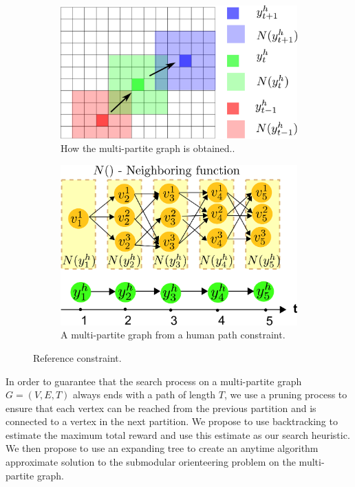 \documentclass[phd]{byuprop}
\begin{document}
\begin{figure}[htbp]
	\centering
	\begin{subfigure}[t]{0.45\linewidth}
		\centering
		\includegraphics[width=\textwidth]{fig/humanConstraint.pdf}
		\caption{How the multi-partite graph is obtained..}
		\label{fig:humanConstraint}
	\end{subfigure}  
	\begin{subfigure}[t]{0.45\linewidth}
		\centering
		\includegraphics[width=\textwidth]{fig/MultiPartite.pdf}
		\caption{A multi-partite graph from a human path constraint.}
		\label{fig:MultiPartite}
	\end{subfigure}   
	\caption{Reference constraint.}
	\label{fig:reference_constraint}
\end{figure}

In order to guarantee that the search process on a multi-partite graph $ G = (V, E, T) $ always ends with a path of length $ T $, we use a pruning process to ensure that each vertex can be reached from the previous partition and is connected to a vertex in the next partition.
We propose to use backtracking to estimate the maximum total reward and use this estimate as our search heuristic.
We then propose to use an expanding tree to create an anytime algorithm approximate solution to the submodular orienteering problem on the multi-partite graph.
\end{document}
